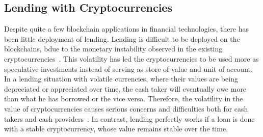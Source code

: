 
\subsection{Lending with Cryptocurrencies}
Despite quite a few blockchain applications in financial technologies, there has been little deployment of lending.
Lending is difficult to be deployed on the blockchains, bdue to the monetary instability observed in the existing cryptocurrencies~\cite{okoyetoward}. This volatility has led the cryptocurrencies to be used more as speculative investments instead of serving as store of value and unit of account. In a lending situation with volatile currencies, where their values are being depreciated or appreciated over time, the cash taker will eventually owe more than what he has borrowed or the vice versa. Therefore, the volatility in the value of cryptocurrencies causes serious concerns and difficulties both for cash takers and cash providers~\cite{okoyetoward}. In contrast, lending perfectly works if a loan is done with a stable cryptocurrency, whose value remains stable over the time.

